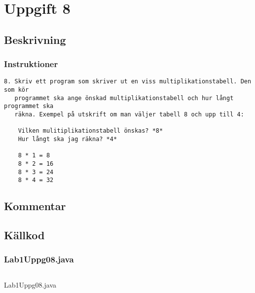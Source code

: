 \section{Uppgift 8}\label{uppgift-8}

\subsection{Beskrivning}

\subsubsection*{Instruktioner}
\begin{verbatim}
8. Skriv ett program som skriver ut en viss multiplikationstabell. Den som kör
   programmet ska ange önskad multiplikationstabell och hur långt programmet ska
   räkna. Exempel på utskrift om man väljer tabell 8 och upp till 4:

    Vilken mulitiplikationstabell önskas? *8*
    Hur långt ska jag räkna? *4*

    8 * 1 = 8
    8 * 2 = 16
    8 * 3 = 24
    8 * 4 = 32
\end{verbatim}

\subsection{Kommentar}

\subsection{Källkod}\label{uppgift-8_src}
\subsubsection*{Lab1Uppg08.java}
\begin{listing}[H]
    \inputminted[]{java}{src/Lab1Uppg08.java}
    \caption{Lab1Uppg08.java}
    \label{Uppg8src}
\end{listing}
